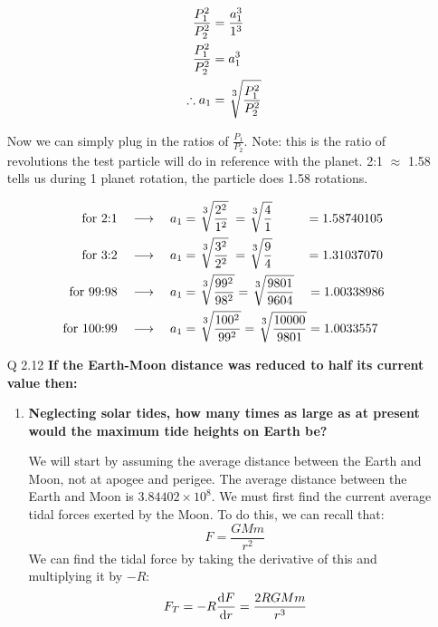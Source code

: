 \documentclass[10pt]{article}
\begin{document}
\begin{enumerate}
		\begin{align*}
			\frac{P_1^2}{P_2^2} &= \frac{a_1^3}{1^3} \\
			\frac{P_1^2}{P_2^2} &= a_1^3 \\
			\therefore a_1 &= \sqrt[\uproot{3}\scriptstyle 3]{\frac{P_1^2}{P_2^2}}
		\end{align*}
		
		Now we can simply plug in the ratios of $\displaystyle \frac{P_1}{P_2}$. Note: this is the ratio of revolutions the test particle will do in reference with the planet. 2:1 $\approx$ 1.58 tells us during 1 planet rotation, the particle does 1.58 rotations.
		
		\begin{align*}
			\text{for 2:1} \quad \longrightarrow \quad a_1 &= \sqrt[\uproot{3}\scriptstyle 3]{\frac{2^2}{1^2}} \; = \sqrt[\uproot{3}\scriptstyle 3]{\frac{4}{1}} \hspace{26px} = 1.58740105 \\ 
			\text{for 3:2} \quad \longrightarrow \quad a_1 &= \sqrt[\uproot{3}\scriptstyle 3]{\frac{3^2}{2^2}} \; = \sqrt[\uproot{3}\scriptstyle 3]{\frac{9}{4}} \hspace{26px} = 1.31037070 \\ 
			\text{for 99:98} \quad \longrightarrow \quad a_1 &= \sqrt[\uproot{3}\scriptstyle 3]{\frac{99^2}{98^2}} = \sqrt[\uproot{3}\scriptstyle 3]{\frac{9801}{9604}} \hspace{10px} = 1.00338986 \\ 
			\text{for 100:99} \quad \longrightarrow \quad a_1 &= \sqrt[\uproot{3}\scriptstyle 3]{\frac{100^2}{99^2}} = \sqrt[\uproot{3}\scriptstyle 3]{\frac{10000}{9801}} = 1.0033557\\ 
		\end{align*}
		
		
		
		\newpage
		\item [Q 2.12] \textbf{If the Earth-Moon distance was reduced to half its current value then: }
		\begin{enumerate}
			\item \textbf{Neglecting solar tides, how many times as large as at present would the maximum tide heights on Earth be?}
			
			We will start by assuming the average distance between the Earth and Moon, not at apogee and perigee. The average distance between the Earth and Moon is $3.84402\times 10^8$. We must first find the current average tidal forces exerted by the Moon. To do this, we can recall that:
			\[ F = \frac{GMm}{r^2} \]
			We can find the tidal force by taking the derivative of this and multiplying it by $-R$:
			\[ F_T = -R \dv{F}{r} = \frac{2RGMm}{r^3} \]
			

\end{enumerate}
\end{enumerate}
\end{document}
